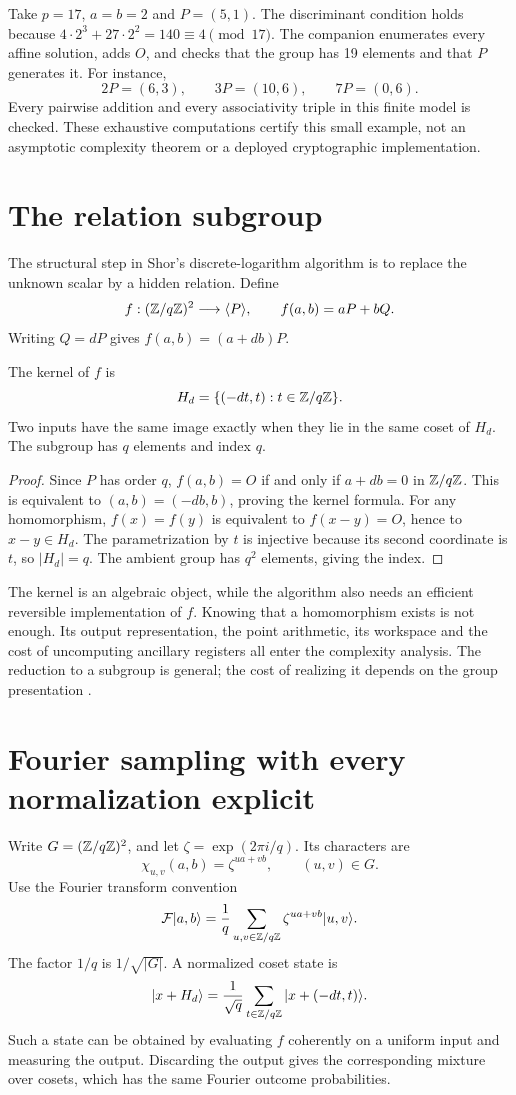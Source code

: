 \begin{example}
Take $p=17$, $a=b=2$ and $P=(5,1)$. The discriminant condition holds because
$4\cdot2^3+27\cdot2^2=140\equiv4\pmod{17}$.
The companion enumerates every affine solution, adds $O$, and checks that the group has 19 elements and that $P$ generates it. For instance,
\[
 2P=(6,3),\qquad 3P=(10,6),\qquad 7P=(0,6).
\]
Every pairwise addition and every associativity triple in this finite model is checked. These exhaustive computations certify this small example, not an asymptotic complexity theorem or a deployed cryptographic implementation.
\end{example}

\section{The relation subgroup}
The structural step in Shor's discrete-logarithm algorithm is to replace the unknown scalar by a hidden relation. Define
\[
 f:(\mathbb{Z}/q\mathbb{Z})^2\longrightarrow\langle P\rangle,
 \qquad f(a,b)=aP+bQ.
\]
Writing $Q=dP$ gives $f(a,b)=(a+db)P$.

\begin{proposition}
The kernel of $f$ is
\[
 H_d=\{(-dt,t):t\in\mathbb{Z}/q\mathbb{Z}\}.
\]
Two inputs have the same image exactly when they lie in the same coset of $H_d$. The subgroup has $q$ elements and index $q$.
\end{proposition}
\begin{proof}
Since $P$ has order $q$, $f(a,b)=O$ if and only if $a+db=0$ in $\mathbb{Z}/q\mathbb{Z}$. This is equivalent to $(a,b)=(-db,b)$, proving the kernel formula. For any homomorphism, $f(x)=f(y)$ is equivalent to $f(x-y)=O$, hence to $x-y\in H_d$. The parametrization by $t$ is injective because its second coordinate is $t$, so $|H_d|=q$. The ambient group has $q^2$ elements, giving the index.
\end{proof}

The kernel is an algebraic object, while the algorithm also needs an efficient reversible implementation of $f$. Knowing that a homomorphism exists is not enough. Its output representation, the point arithmetic, its workspace and the cost of uncomputing ancillary registers all enter the complexity analysis. The reduction to a subgroup is general; the cost of realizing it depends on the group presentation \cite{Shor,ProosZalka}.

\section{Fourier sampling with every normalization explicit}
Write $G=(\mathbb{Z}/q\mathbb{Z})^2$, and let $\zeta=\exp(2\pi i/q)$. Its characters are
\[
 \chi_{u,v}(a,b)=\zeta^{ua+vb},\qquad (u,v)\in G.
\]
Use the Fourier transform convention
\[
 \mathcal F|a,b\rangle
 =\frac1q\sum_{u,v\in\mathbb{Z}/q\mathbb{Z}}\zeta^{ua+vb}|u,v\rangle.
\]
The factor $1/q$ is $1/\sqrt{|G|}$. A normalized coset state is
\[
 |x+H_d\rangle=\frac1{\sqrt q}\sum_{t\in\mathbb{Z}/q\mathbb{Z}}|x+(-dt,t)\rangle.
\]
Such a state can be obtained by evaluating $f$ coherently on a uniform input and measuring the output. Discarding the output gives the corresponding mixture over cosets, which has the same Fourier outcome probabilities.

